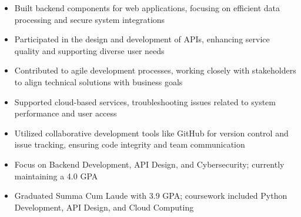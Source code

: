 \par\smallskip
\noindent
\begin{minipage}{20cm}
  \begin{minipage}{9.75cm}
    \begin{itemize}
      \item Built backend components for web applications, focusing on efficient data processing and secure system integrations
      \item Participated in the design and development of APIs, enhancing service quality and supporting diverse user needs
      \item Contributed to agile development processes, working closely with stakeholders to align technical solutions with business goals
    \end{itemize}
  \end{minipage}
  \hfill
  \begin{minipage}{9.75cm}
    \begin{itemize}
      \item Supported cloud-based services, troubleshooting issues related to system performance and user access
      \item Utilized collaborative development tools like GitHub for version control and issue tracking, ensuring code integrity and team communication
    \end{itemize}
  \end{minipage}
\end{minipage}

\begin{itemize}
  \item Focus on Backend Development, API Design, and Cybersecurity; currently maintaining a 4.0 GPA
\end{itemize}
\divider

\begin{itemize}
  \item Graduated Summa Cum Laude with 3.9 GPA; coursework included Python Development, API Design, and Cloud Computing
\end{itemize}

\noindent
\begin{minipage}{20cm}
     
     
     
\end{minipage}


